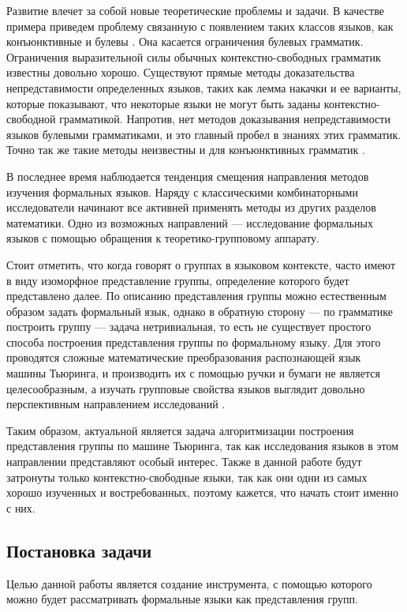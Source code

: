 \documentclass[14pt]{matmex-diploma-custom}
\begin{document}
Развитие влечет за собой новые теоретические проблемы и задачи. 
В качестве примера приведем проблему связанную с появлением таких классов языков, как конъюнктивные \cite{ConjGrammars} и булевы \cite{BoolGrammars}.
Она касается
ограничения булевых грамматик. Ограничения выразительной силы обычных контекстно-свободных грамматик
известны довольно хорошо. Существуют прямые методы доказательства непредставимости
определенных языков, таких как лемма накачки и ее
варианты, которые показывают, что некоторые языки не могут быть заданы
 контекстно-свободной грамматикой. Напротив, нет методов доказывания
непредставимости языков булевыми грамматиками, и это главный пробел в
знаниях этих грамматик. Точно так же такие методы неизвестны
и для конъюнктивных грамматик \cite{OKHOTIN201327}.

В последнее время наблюдается тенденция смещения направления методов изучения формальных языков. Наряду с классическими комбинаторными исследователи начинают все активней применять методы из других разделов математики.
Одно из возможных направлений --- исследование формальных языков с помощью обращения 
к теоретико-групповому аппарату.

Стоит отметить, что когда говорят о группах в языковом контексте, часто имеют в виду изоморфное представление группы, определение которого будет представлено далее.
По описанию представления группы можно естественным образом задать формальный язык, однако в обратную сторону --- по грамматике построить группу --- задача нетривиальная, то есть не существует простого способа построения представления группы по формальному языку.
Для этого проводятся сложные математические преобразования распознающей язык машины Тьюринга, и
производить их с помощью ручки и бумаги не является целесообразным, а изучать
групповые свойства языков выглядит довольно перспективным направлением исследований \cite{Sapir, SpaceFunc}.

Таким образом, актуальной является задача алгоритмизации построения представления группы по машине Тьюринга, так как исследования языков в этом направлении представляют особый интерес. Также в данной работе будут затронуты только контекстно-свободные языки, так как они одни из самых хорошо изученных и востребованных, поэтому кажется, что начать стоит именно с них. 

\subsection*{Постановка задачи}
Целью данной работы является создание инструмента, с помощью которого можно будет 
рассматривать формальные языки как представления групп.
\end{document}
